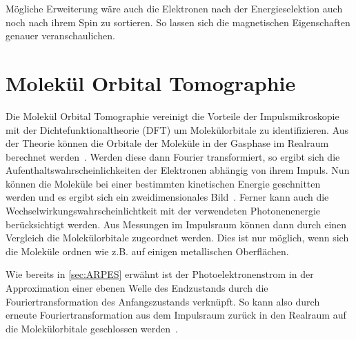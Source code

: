             Mögliche Erweiterung wäre auch die Elektronen nach der Energieselektion auch noch nach ihrem Spin zu sortieren.
            So lassen sich die magnetischen Eigenschaften genauer veranschaulichen.
        
    \section{Molekül Orbital Tomographie} \label{sec:MOT}
        Die Molekül Orbital Tomographie vereinigt die Vorteile der Impulsmikroskopie mit der Dichtefunktionaltheorie (DFT) um Molekülorbitale zu identifizieren.
        Aus der Theorie können die Orbitale der Moleküle in der Gasphase im Realraum berechnet werden~\cite{database}.
        Werden diese dann Fourier transformiert, so ergibt sich die Aufenthaltswahrscheinlichkeiten der Elektronen abhängig von ihrem Impuls.
        Nun können die Moleküle bei einer bestimmten kinetischen Energie geschnitten werden und es ergibt sich ein zweidimensionales Bild~\cite{brandstetter_kmappy_2021}.
        Ferner kann auch die Wechselwirkungswahrscheinlichtkeit mit der verwendeten Photonenenergie berücksichtigt werden.
        Aus Messungen im Impulsraum können dann durch einen Vergleich die Molekülorbitale zugeordnet werden.
        Dies ist nur möglich, wenn sich die Moleküle ordnen wie z.B. auf einigen metallischen Oberflächen.

        Wie bereits in \autoref{sec:ARPES} erwähnt ist der Photoelektronenstrom in der Approximation einer ebenen Welle des Endzustands durch die Fouriertransformation des Anfangszustands verknüpft.
        So kann also durch erneute Fouriertransformation aus dem Impulsraum zurück in den Realraum auf die Molekülorbitale geschlossen werden~\cite{MM_2}.

